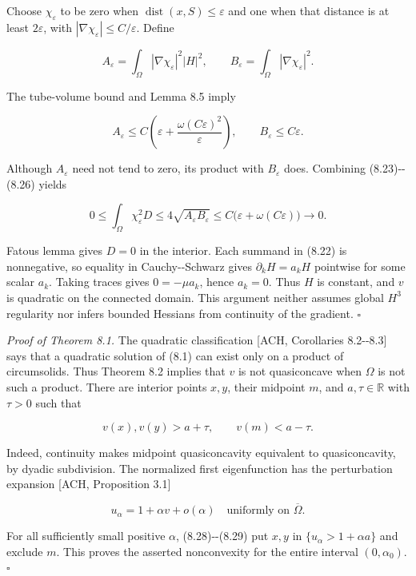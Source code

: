 \documentclass[11pt]{article}
\begin{document}
Choose \(\chi_\varepsilon\) to be zero when
\(\operatorname{dist}(x,S)\le\varepsilon\) and one when that distance is
at least \(2\varepsilon\), with
\(|\nabla\chi_\varepsilon|\le C/\varepsilon\). Define

\[
A_\varepsilon=\int_\Omega|\nabla\chi_\varepsilon|^2|H|^2,
\qquad B_\varepsilon=\int_\Omega|\nabla\chi_\varepsilon|^2.
\tag{8.25}
\]

The tube-volume bound and Lemma 8.5 imply

\[
A_\varepsilon\le C\left(\varepsilon+
  \frac{\omega(C\varepsilon)^2}{\varepsilon}\right),
\qquad B_\varepsilon\le C\varepsilon.
\tag{8.26}
\]

Although \(A_\varepsilon\) need not tend to zero, its product with
\(B_\varepsilon\) does. Combining (8.23)-\/-(8.26) yields

\[
0\le\int_\Omega\chi_\varepsilon^2D
 \le4\sqrt{A_\varepsilon B_\varepsilon}
 \le C\bigl(\varepsilon+\omega(C\varepsilon)\bigr)
 \longrightarrow0.
\tag{8.27}
\]

Fatou\textquotesingle s lemma gives \(D=0\) in the interior. Each
summand in (8.22) is nonnegative, so equality in Cauchy-\/-Schwarz gives
\(\partial_kH=a_kH\) pointwise for some scalar \(a_k\). Taking traces
gives \(0=-\mu a_k\), hence \(a_k=0\). Thus \(H\) is constant, and \(v\)
is quadratic on the connected domain. This argument neither assumes
global \(H^3\) regularity nor infers bounded Hessians from continuity of
the gradient. \(\square\)

\emph{Proof of Theorem 8.1.} The quadratic classification {[}ACH,
Corollaries 8.2-\/-8.3{]} says that a quadratic solution of (8.1) can
exist only on a product of circumsolids. Thus Theorem 8.2 implies that
\(v\) is not quasiconcave when \(\Omega\) is not such a product. There
are interior points \(x,y\), their midpoint \(m\), and
\(a,\tau\in\mathbb R\) with \(\tau>0\) such that

\[
v(x),v(y)>a+\tau,
\qquad v(m)<a-\tau.
\tag{8.28}
\]

Indeed, continuity makes midpoint quasiconcavity equivalent to
quasiconcavity, by dyadic subdivision. The normalized first
eigenfunction has the perturbation expansion {[}ACH, Proposition 3.1{]}

\[
u_\alpha=1+\alpha v+o(\alpha)
\quad\text{uniformly on }\overline\Omega.
\tag{8.29}
\]

For all sufficiently small positive \(\alpha\), (8.28)-\/-(8.29) put
\(x,y\) in \(\{u_\alpha>1+\alpha a\}\) and exclude \(m\). This proves
the asserted nonconvexity for the entire interval \((0,\alpha_0)\). \(\square\)
\end{document}
